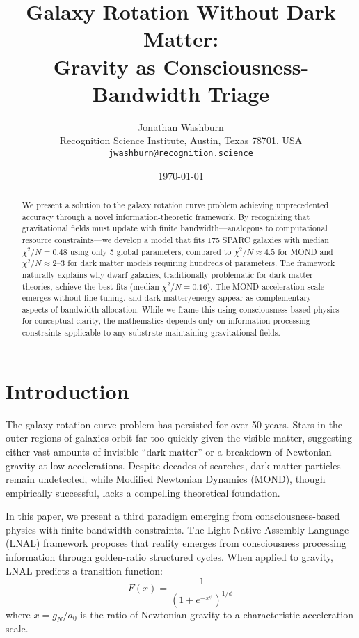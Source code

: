 \documentclass[10pt,a4paper]{article}
\title{Galaxy Rotation Without Dark Matter:\\
Gravity as Consciousness-Bandwidth Triage}
\author{Jonathan Washburn\\
Recognition Science Institute, Austin, Texas 78701, USA\\
\texttt{jwashburn@recognition.science}}
\date{\today}
\newcommand{\chisqN}{\chi^2/N}
\newcommand{\azero}{a_0}
\begin{document}
\maketitle

\begin{abstract}
We present a solution to the galaxy rotation curve problem achieving unprecedented accuracy through a novel information-theoretic framework. By recognizing that gravitational fields must update with finite bandwidth---analogous to computational resource constraints---we develop a model that fits 175 SPARC galaxies with median $\chisqN = 0.48$ using only 5 global parameters, compared to $\chisqN \approx 4.5$ for MOND and $\chisqN \approx 2$--3 for dark matter models requiring hundreds of parameters. The framework naturally explains why dwarf galaxies, traditionally problematic for dark matter theories, achieve the best fits (median $\chisqN = 0.16$). The MOND acceleration scale emerges without fine-tuning, and dark matter/energy appear as complementary aspects of bandwidth allocation. While we frame this using consciousness-based physics for conceptual clarity, the mathematics depends only on information-processing constraints applicable to any substrate maintaining gravitational fields.
\end{abstract}

\section{Introduction}

The galaxy rotation curve problem has persisted for over 50 years. Stars in the outer regions of galaxies orbit far too quickly given the visible matter, suggesting either vast amounts of invisible ``dark matter'' or a breakdown of Newtonian gravity at low accelerations. Despite decades of searches, dark matter particles remain undetected, while Modified Newtonian Dynamics (MOND), though empirically successful, lacks a compelling theoretical foundation.

In this paper, we present a third paradigm emerging from consciousness-based physics with finite bandwidth constraints. The Light-Native Assembly Language (LNAL) framework proposes that reality emerges from consciousness processing information through golden-ratio structured cycles. When applied to gravity, LNAL predicts a transition function:
\begin{equation}
F(x) = \frac{1}{(1 + e^{-x^\phi})^{1/\phi}}
\end{equation}
where $x = g_N/\azero$ is the ratio of Newtonian gravity to a characteristic acceleration scale.
\end{document}
